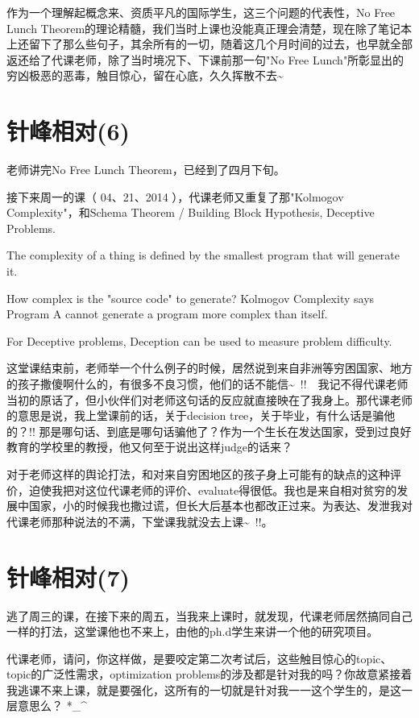 \documentclass[12pt]{book}
\begin{document}
作为一个理解起概念来、资质平凡的国际学生，这三个问题的代表性，No Free Lunch Theorem的理论精髓，我们当时上课也没能真正理会清楚，现在除了笔记本上还留下了那么些句子，其余所有的一切，随着这几个月时间的过去，也早就全部返还给了代课老师，除了当时境况下、下课前那一句"No Free Lunch"所彰显出的穷凶极恶的恶毒，触目惊心，留在心底，久久挥散不去\textasciitilde{}~

\section{针峰相对(6)}
\label{sec-34-6}

老师讲完No Free Lunch Theorem，已经到了四月下旬。

接下来周一的课（ 04、21、2014 ），代课老师又重复了那"Kolmogov Complexity"，和Schema Theorem / Building Block Hypothesis, Deceptive Problems. 

The complexity of a thing is defined by the smallest program that will generate it. 

How complex is the "source code" to generate?  Kolmogov Complexity says Program A cannot generate a program more complex than itself. 

For Deceptive problems, Deception can be used to measure problem difficulty. 

这堂课结束前，老师举一个什么例子的时候，居然说到来自非洲等穷困国家、地方的孩子撒傻啊什么的，有很多不良习惯，他们的话不能信\textasciitilde{}~!!　我记不得代课老师当初的原话了，但小伙伴们对老师这句话的反应就直接映在了我身上。那代课老师的意思是说，我上堂课前的话，关于decision tree，关于毕业，有什么话是骗他的？!! 那是哪句话、到底是哪句话骗他了？作为一个生长在发达国家，受到过良好教育的学校里的教授，他又何至于说出这样judge的话来？

对于老师这样的舆论打法，和对来自穷困地区的孩子身上可能有的缺点的这种评价，迫使我把对这位代课老师的评价、evaluate得很低。我也是来自相对贫穷的发展中国家，小的时候我也撒过谎，但长大后基本也都改正过来。为表达、发泄我对代课老师那种说法的不满，下堂课我就没去上课\textasciitilde{}~!!。

\section{针峰相对(7)}
\label{sec-34-7}

逃了周三的课，在接下来的周五，当我来上课时，就发现，代课老师居然搞同自己一样的打法，这堂课他也不来上，由他的ph.d学生来讲一个他的研究项目。

代课老师，请问，你这样做，是要咬定第二次考试后，这些触目惊心的topic、topic的广泛性需求，optimization problems的涉及都是针对我的吗？你故意紧接着我逃课不来上课，就是要强化，这所有的一切就是针对我一一这个学生的，是这一层意思么？ *\_\^{}
\end{document}
